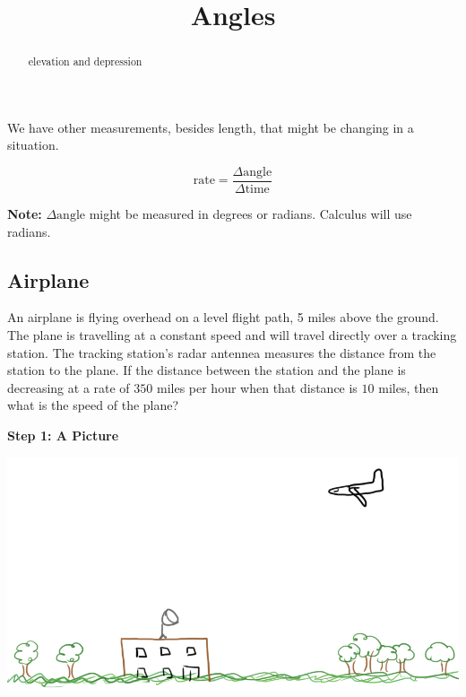 \documentclass{ximera}
\title{Angles}
\begin{document}
\begin{abstract}
elevation and depression
\end{abstract}
\maketitle


We have other measurements, besides length, that might be changing in a situation.




\[
\text{rate} = \frac{\Delta \text{angle}}{\Delta \text{time}} 
\]

\textbf{Note:} $\Delta \text{angle}$ might be measured in degrees or radians. Calculus will use radians.\\






\subsection{Airplane}

An airplane is flying overhead on a level flight path, 5 miles above the ground.  The plane is travelling at a constant speed and will travel directly over a tracking station. The tracking station's radar antennea measures the distance from the station to the plane. If the distance between the station and the plane is decreasing at a rate of $350$ miles per hour when that distance is $10$ miles, then what is the speed of the plane?









\textbf{\textcolor{purple!85!blue}{Step 1: A Picture}}


\begin{image}
\includegraphics{pics/plane_1.png}
\end{image}
\end{document}
